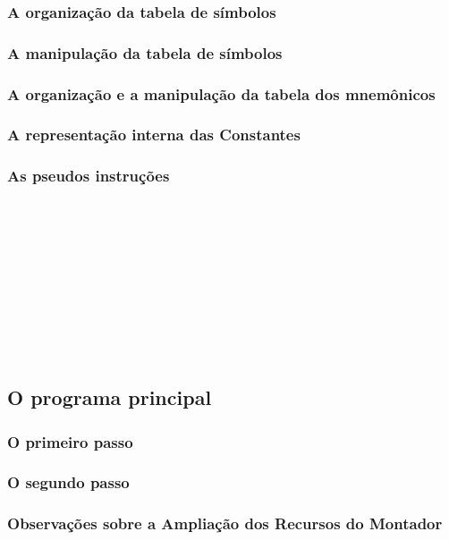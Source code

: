 \documentclass[a4paper,12pt]{article}
\begin{document}
\subsubsection{A organização da tabela de símbolos}
\subsubsection{A manipulação da tabela de símbolos}
\subsubsection{A organização e a manipulação da tabela dos mnemônicos}
\subsubsection{A representação interna das Constantes}
\subsubsection{As pseudos instruções}
\\
\\
\\
\\
\\
\\
\\
\\
\\

\subsection{O programa principal}
\subsubsection{O primeiro passo}

\subsubsection{O segundo passo}

\subsubsection{Observações sobre a Ampliação dos Recursos do Montador}
\end{document}

